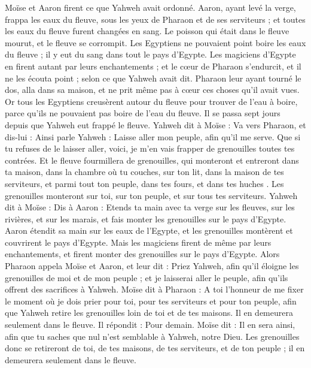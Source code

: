 \begin{multicols}{2}
Moïse et Aaron firent ce que Yahweh avait ordonné. Aaron, ayant levé la verge, frappa les eaux du fleuve, sous les yeux de Pharaon et de ses serviteurs ; et toutes les eaux du fleuve furent changées en sang.
Le poisson qui était dans le fleuve mourut, et le fleuve se corrompit. Les Egyptiens ne pouvaient point boire les eaux du fleuve ; il y eut du sang dans tout le pays d'Egypte.
Les magiciens d'Egypte en firent autant par leurs enchantements ; et le cœur de Pharaon s'endurcit, et il ne les écouta point ; selon ce que Yahweh avait dit.
Pharaon leur ayant tourné le dos, alla dans sa maison, et ne prit même pas à cœur ces choses qu'il avait vues.
Or tous les Egyptiens creusèrent autour du fleuve pour trouver de l'eau à boire, parce qu'ils ne pouvaient pas boire de l'eau du fleuve.
Il se passa sept jours depuis que Yahweh eut frappé le fleuve.
Yahweh dit à Moïse : Va vers Pharaon, et dis-lui : Ainsi parle Yahweh : Laisse aller mon peuple, afin qu'il me serve.
Que si tu refuses de le laisser aller, voici, je m'en vais frapper de grenouilles toutes tes contrées.
Et le fleuve fourmillera de grenouilles, qui monteront et entreront dans ta maison, dans la chambre où tu couches, sur ton lit, dans la maison de tes serviteurs, et parmi tout ton peuple, dans tes fours, et dans tes huches .
Les grenouilles monteront sur toi, sur ton peuple, et sur tous tes serviteurs.
\VerseOne{}Yahweh dit à Moïse : Dis à Aaron : Etends ta main avec ta verge sur les fleuves, sur les rivières, et sur les marais, et fais monter les grenouilles sur le pays d'Egypte.
Aaron étendit sa main sur les eaux de l'Egypte, et les grenouilles montèrent et couvrirent le pays d'Egypte.
Mais les magiciens firent de même par leurs enchantements, et firent monter des grenouilles sur le pays d'Egypte.
Alors Pharaon appela Moïse et Aaron, et leur dit : Priez Yahweh, afin qu'il éloigne les grenouilles de moi et de mon peuple ; et je laisserai aller le peuple, afin qu'ils offrent des sacrifices à Yahweh.
Moïse dit à Pharaon : A toi l’honneur de me fixer le moment où je dois prier pour toi, pour tes serviteurs et pour ton peuple, afin que Yahweh retire les grenouilles loin de toi et de tes maisons. Il en demeurera seulement dans le fleuve.
Il répondit : Pour demain. Moïse dit : Il en sera ainsi, afin que tu saches que nul n’est semblable à Yahweh, notre Dieu.
Les grenouilles donc se retireront de toi, de tes maisons, de tes serviteurs, et de ton peuple ; il en demeurera seulement dans le fleuve.

\end{multicols}

